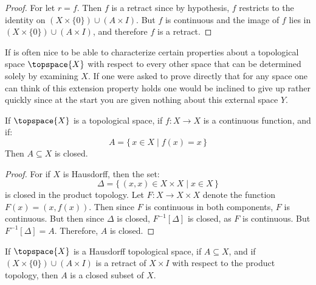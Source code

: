         \begin{proof}
            For let $r=f$. Then $f$ is a retract since by hypothesis,
            $f$ restricts to the identity on
            $(X\times\{0\})\cup(A\times{I})$. But $f$ is continuous and
            the image of $f$ lies in $(X\times\{0\})\cup(A\times{I})$,
            and therefore $f$ is a retract.
        \end{proof}
        If is often nice to be able to characterize certain properties
        about a topological space $\topspace{X}$ with respect to every
        other space that can be determined solely by examining $X$. If
        one were asked to prove directly that for any space one can
        think of this extension property holds one would be inclined to
        give up rather quickly since at the start you are given nothing
        about this external space $Y$.
        \begin{theorem}
            If $\topspace{X}$ is a topological space, if
            $f:X\rightarrow{X}$ is a continuous function, and if:
            \begin{equation}
                A=\{\,x\in{X}\;|\;f(x)=x\,\}
            \end{equation}
            Then $A\subseteq{X}$ is closed.
        \end{theorem}
        \begin{proof}
            For if $X$ is Hausdorff, then the set:
            \begin{equation}
                \Delta=\{\,(x,x)\in{X}\times{X}\;|\;x\in{X}\,\}
            \end{equation}
            is closed in the product topology. Let
            $F:X\rightarrow{X}\times{X}$ denote the function
            $F(x)=(x,f(x))$. Then since $F$ is continuous in both
            components, $F$ is continuous. But then since $\Delta$ is
            closed, $F^{\minus{1}}[\Delta]$ is closed, as $F$ is
            continuous. But $F^{\minus{1}}[\Delta]=A$. Therefore, $A$ is
            closed.
        \end{proof}
        \begin{theorem}
            If $\topspace{X}$ is a Hausdorff topological space, if
            $A\subseteq{X}$, and if $(X\times\{0\})\cup(A\times{I})$ is
            a retract of $X\times{I}$ with respect to the product
            topology, then $A$ is a closed subset of $X$.
        \end{theorem}
